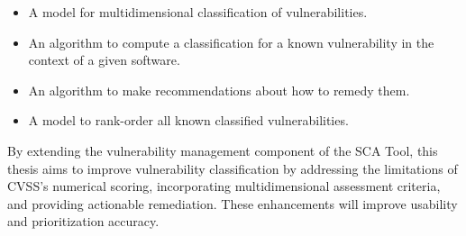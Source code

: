 \begin{itemize}
    \item A model for multidimensional classification of vulnerabilities.
    \item An algorithm to compute a classification for a known vulnerability in the context of a given software.
    \item An algorithm to make recommendations about how to remedy them.
    \item A model to rank-order all known classified vulnerabilities.
\end{itemize}

By extending the vulnerability management component of the \ac{SCA} Tool, this thesis aims to improve vulnerability classification by addressing the limitations of \ac{CVSS}'s numerical scoring, incorporating multidimensional assessment criteria, and providing actionable remediation. These enhancements will improve usability and prioritization accuracy.